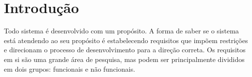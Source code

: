 \section{Introdução}

Todo sistema é desenvolvido com um propósito. A forma de saber se o sistema está atendendo ao seu propósito é estabelecendo requisitos que impõem restrições e direcionam o processo de desenvolvimento para a direção correta. Os requisitos em si são uma grande área de pesquisa, mas podem ser principalmente divididos em dois grupos: funcionais e não funcionais.
